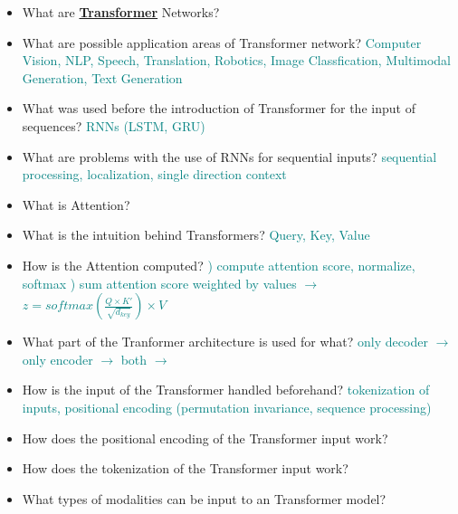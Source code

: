 \documentclass{report}
\newcommand{\asw}[2][teal]{}
\renewcommand{\asw}[2][teal]{\textcolor{#1}{#2}}
\begin{document}
\begin{itemize}
		\item What are \textbf{\underline{Transformer}} Networks?
		\asw{\newline }
		\item What are possible application areas of Transformer network?
		\asw{\newline Computer Vision, NLP, Speech, Translation, Robotics, Image Classfication, Multimodal Generation, Text Generation}
		\item What was used before the introduction of Transformer for the input of sequences?
		\asw{\newline RNNs (LSTM, GRU)}
		\item What are problems with the use of RNNs for sequential inputs?
		\asw{\newline sequential processing, localization, single direction context}
		\item What is Attention?
		\asw{\newline }
		\item What is the intuition behind Transformers?
		\asw{\newline Query, Key, Value}
		\item How is the Attention computed?
		\asw{) compute attention score, normalize, softmax
		\newline 2) sum attention score weighted by values
		\newline $\rightarrow$ $z = softmax(\frac{Q \times K'}{\sqrt{d_{key}}}) \times V$}
		\item What part of the Tranformer architecture is used for what?
		\asw{\newline only decoder $\rightarrow$
		\newline only encoder $\rightarrow$
		\newline both $\rightarrow$}
		\item How is the input of the Transformer handled beforehand?
		\asw{\newline tokenization of inputs, positional encoding (permutation invariance, sequence processing)}
		\item How does the positional encoding of the Transformer input work?
		\asw{\newline }
		\item How does the tokenization of the Transformer input work?
		\asw{\newline }
		\item What types of modalities can be input to an Transformer model?
		\asw{\newline }

\end{itemize}
\end{document}
